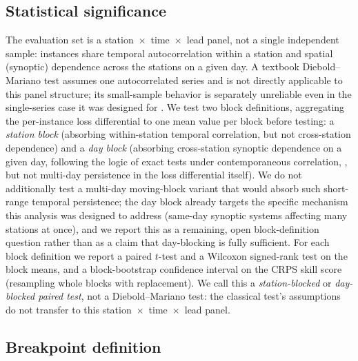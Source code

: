 \subsection{Statistical significance}
\label{sec:significance}

The evaluation set is a station~$\times$~time~$\times$~lead panel, not a
single independent sample: instances share temporal autocorrelation within
a station and spatial (synoptic) dependence across the \NStations{}
stations on a given day. A textbook Diebold--Mariano test
\citep{diebold_1995_comparing_accuracy,diebold_2015_twenty_years} assumes one
autocorrelated series and is not directly applicable to this panel structure;
its small-sample behavior is separately unreliable even in the single-series
case it was designed for \citep{coroneo_2020_small_samples}. We test two
block definitions, aggregating the per-instance loss differential to one
mean value per block before testing: a \emph{station block} (absorbing
within-station temporal correlation, but not cross-station dependence) and
a \emph{day block} (absorbing cross-station synoptic dependence on a given
day, following the logic of exact tests under contemporaneous correlation,
\citealp{luger_2004_exact_tests}, but not multi-day persistence in the loss
differential itself). We do not additionally test a multi-day moving-block
variant that would absorb such short-range temporal persistence; the day
block already targets the specific mechanism this analysis was designed to
address (same-day synoptic systems affecting many stations at once), and we
report this as a remaining, open block-definition question rather than as a
claim that day-blocking is fully sufficient. For each block definition we
report a paired \(t\)-test and a Wilcoxon signed-rank test on the block
means, and a block-bootstrap confidence interval on the CRPS skill score
(resampling whole blocks with replacement). We call this a
\emph{station-blocked} or \emph{day-blocked paired test}, not a
Diebold--Mariano test: the classical test's assumptions do not transfer to
this station~$\times$~time~$\times$~lead panel.

\subsection{Breakpoint definition}
\label{sec:breakpoint-def}

